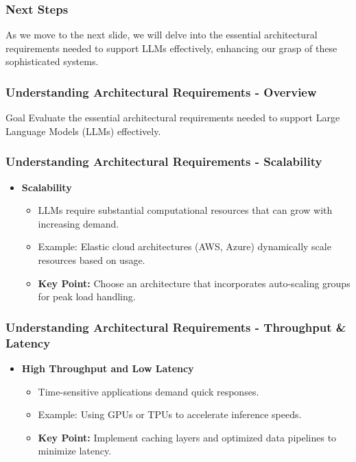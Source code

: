 \documentclass[aspectratio=169]{beamer}
\begin{document}
\begin{frame}[fragile]
    \frametitle{Next Steps}
    As we move to the next slide, we will delve into the essential architectural requirements needed to support LLMs effectively, enhancing our grasp of these sophisticated systems.
\end{frame}

\begin{frame}[fragile]
    \frametitle{Understanding Architectural Requirements - Overview}
    \begin{block}{Goal}
        Evaluate the essential architectural requirements needed to support Large Language Models (LLMs) effectively.
    \end{block}
\end{frame}

\begin{frame}[fragile]
    \frametitle{Understanding Architectural Requirements - Scalability}
    \begin{itemize}
        \item \textbf{Scalability}
        \begin{itemize}
            \item LLMs require substantial computational resources that can grow with increasing demand.
            \item Example: Elastic cloud architectures (AWS, Azure) dynamically scale resources based on usage.
            \item \textbf{Key Point:} Choose an architecture that incorporates auto-scaling groups for peak load handling.
        \end{itemize}
    \end{itemize}
\end{frame}

\begin{frame}[fragile]
    \frametitle{Understanding Architectural Requirements - Throughput & Latency}
    \begin{itemize}
        \item \textbf{High Throughput and Low Latency}
        \begin{itemize}
            \item Time-sensitive applications demand quick responses.
            \item Example: Using GPUs or TPUs to accelerate inference speeds.
            \item \textbf{Key Point:} Implement caching layers and optimized data pipelines to minimize latency.
        \end{itemize}
    \end{itemize}
\end{frame}
\end{document}

